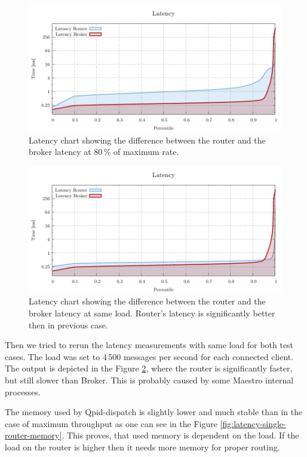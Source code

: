 \begin{figure}[H]
	\centering
	\includegraphics[width=1\linewidth]{obrazky-figures/charts/singlepoint-latency.pdf}
	\caption{Latency chart showing the difference between the router and the broker latency at 80\,\% of maximum rate.}
	\label{fig:latency-single-router}
\end{figure}

\begin{figure}[H]
	\centering
	\includegraphics[width=1\linewidth]{obrazky-figures/charts/singlepoint-latency-18k.pdf}
	\caption{Latency chart showing the difference between the router and the broker latency at same load. Router's latency is significantly better then in previous case.}
	\label{fig:latency-single-same-load}
\end{figure}

Then we tried to rerun the latency measurements with same load for both test cases. The load was set to 4\,500 messages per second for each connected client. The output is depicted in the Figure \ref{fig:latency-single-same-load}, where the router is significantly faster, but still slower than Broker. This is probably caused by some Maestro internal processes.

The memory used by Qpid-dispatch is slightly lower and much stable than in the case of maximum throughput as one can see in the Figure \ref{fig:latency-single-router-memory}. This proves, that used memory is dependent on the load. If the load on the router is higher then it needs more memory for proper routing.

